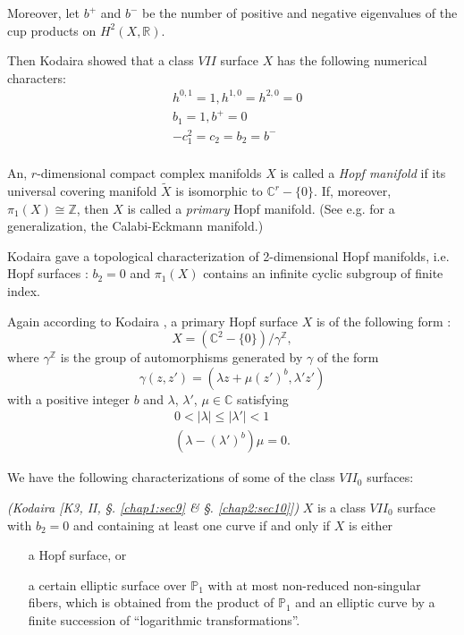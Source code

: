  \noindent
 Moreover, let $b^+$ and $b^-$ be the number of positive and negative
 eigenvalues of the cup products on $H^2(X, \mathbb{R})$. 
 
 Then Kodaira \cite[I, Thm 3]{keyK3} showed that a class $VII$ surface $X$
 has the following numerical characters:  
 \begin{align*}
& h^{0,1}=1, h^{1,0}= h^{2, 0} = 0\\
& b_1 =1, b^+  = 0\\
& -c^2_1=c_2 =b_2  = b^-\\
 \end{align*} 
 
 \begin{defi*}
An, $r$-dimensional compact complex manifolds $X$ is called a {\em Hopf
  manifold} if its universal covering manifold $\tilde{X}$ is
isomorphic to $\mathbb{C}^r- \{0\}$. If, moreover,  $\pi_1 (X) \cong
\mathbb{Z}$, then $X$ is called a {\em primary} Hopf manifold. (See
e.g. \cite{keyA1} for a generalization, the Calabi-Eckmann manifold.) 
 \end{defi*} 
 
 Kodaira\pageoriginale \cite[III, Thm 41]{keyK3} gave a topological
 characterization of 2-dimensional Hopf manifolds, i.e. Hopf surfaces
 : $b_2 = 0$ and $\pi_1 (X)$ contains an infinite cyclic subgroup of
 finite index.  
 
 Again according to Kodaira \cite[II, Thm 30]{keyK3}, a primary Hopf
 surface $X$ is of the following form : 
 $$
 X =(\mathbb{C}^2-\{0\})/ \gamma^{\mathbb{Z}},
 $$
 where $\gamma^{\mathbb{Z}}$ is the group of automorphisms generated
 by $\gamma$ of the form  
 $$
 \gamma(z,z') = (\lambda z+ \mu(z')^b, \lambda' z')
 $$
 with a positive integer $b$ and $\lambda$, $\lambda'$, $\mu \in
 \mathbb{C}$ satisfying  
\begin{gather*}
 0 < | \lambda| \le |\lambda'|<1\\
 (\lambda-(\lambda')^b) \mu =0.
\end{gather*}

We have the following characterizations of some of the class $VII_0$
surfaces: 

\begin{theorem*}{\em (Kodaira [K3, II, \S. \ref{chap1:sec9} \&
      \S. \ref{chap2:sec10}])} 
 $X$ is a class $VII_0$ surface with  $b_2 = 0$ and containing at
  least one curve if and only  if $X$ is either   
\begin{itemize}
\item[a] Hopf surface, or 

\item[a] certain elliptic surface over $\mathbb{P}_1$ with at most
  non-reduced non-singular fibers, which is obtained from the product
  of $\mathbb{P}_1$ and an elliptic curve by a finite succession of
  ``logarithmic transformations''. 
\end{itemize}
\end{theorem*}

